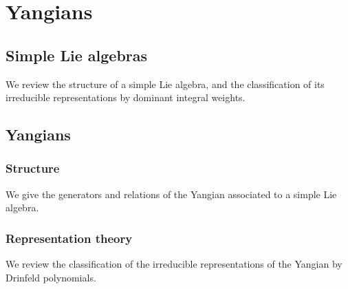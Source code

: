 \chapter{Yangians}

\section{Simple Lie algebras}

We review the structure of a simple Lie algebra, and the classification of its irreducible representations by dominant integral weights.


\section{Yangians}

\subsection{Structure}

We give the generators and relations of the Yangian associated to a simple Lie algebra.

\subsection{Representation theory}

We review the classification of the irreducible representations of the Yangian by Drinfeld polynomials.
